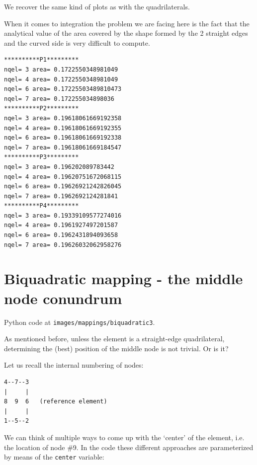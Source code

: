 We recover the same kind of plots as with the quadrilaterals. 

When it comes to integration the problem we are facing here is the 
fact that the analytical value of the area covered by the shape 
formed by the 2 straight edges and the curved side is very difficult to compute.

\begin{verbatim}
**********P1*********
nqel= 3 area= 0.1722550348981049
nqel= 4 area= 0.1722550348981049
nqel= 6 area= 0.17225503489810473
nqel= 7 area= 0.172255034898036
**********P2*********
nqel= 3 area= 0.19618061669192358
nqel= 4 area= 0.19618061669192355
nqel= 6 area= 0.19618061669192338
nqel= 7 area= 0.19618061669184547
**********P3*********
nqel= 3 area= 0.196202089783442
nqel= 4 area= 0.19620751672068115
nqel= 6 area= 0.19626921242826045
nqel= 7 area= 0.1962692124281841
**********P4*********
nqel= 3 area= 0.19339109577274016
nqel= 4 area= 0.1961927497201587
nqel= 6 area= 0.1962431894093658
nqel= 7 area= 0.19626032062958276
\end{verbatim}





\newpage

\section{Biquadratic mapping - the middle node conundrum}

Python code at {\tt images/mappings/biquadratic3}.

As mentioned before, unless the element is a straight-edge quadrilateral, 
determining the (best) position of the middle node is not trivial. Or is it?

Let us recall the internal numbering of nodes:
\begin{verbatim}
4--7--3
|     |
8  9  6   (reference element)
|     |
1--5--2
\end{verbatim}


We can think of multiple ways to come up with the `center' of the element, 
i.e. the location of node \#9. %
In the code these different approaches are parameterized by means of the
\lstinline{center} variable:

